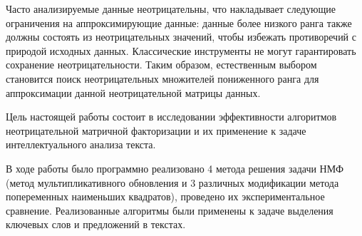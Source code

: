 Часто анализируемые данные неотрицательны, что накладывает следующие ограничения на аппроксимирующие данные:
данные более низкого ранга также должны состоять из неотрицательных значений, чтобы избежать противоречий с природой исходных данных.
Классические инструменты не могут гарантировать сохранение неотрицательности.
Таким образом, естественным выбором становится поиск неотрицательных множителей пониженного ранга для аппроксимации данной неотрицательной матрицы данных.

Цель настоящей работы состоит в исследовании эффективности алгоритмов неотрицательной матричной факторизации и их применение к задаче интеллектуального анализа текста.

В ходе работы было программно реализовано 4 метода решения задачи НМФ
(метод мультипликативного обновления и 3 различных модификации метода попеременных наименьших квадратов), проведено их экспериментальное сравнение.
Реализованные алгоритмы были применены к задаче выделения ключевых слов и предложений в текстах.
